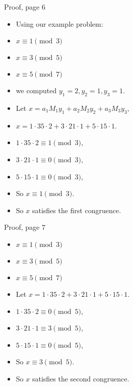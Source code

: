 \documentclass[handout]{beamer}
\begin{document}
\begin{frame}{Proof, page 6}

\begin{itemize}
  \item Using our example problem:
  \item $x \equiv 1 \pmod 3$
  \item $x \equiv 3 \pmod 5$
  \item $x \equiv 5 \pmod 7$
  \item we computed $y_1 = 2, y_2 = 1, y_3 = 1$.
  \item Let $x = a_1 M_1 y_1 + a_2 M_2 y_2 + a_3 M_3 y_3$,
  \item $x = 1 \cdot 35 \cdot 2 + 3 \cdot 21 \cdot 1 + 5 \cdot 15 \cdot 1$.
  \item $1 \cdot 35 \cdot 2 \equiv 1 \pmod 3$,
  \item $3 \cdot 21 \cdot 1 \equiv 0 \pmod 3$,
  \item $5 \cdot 15 \cdot 1 \equiv 0 \pmod 3$,
  \item So $x \equiv 1 \pmod 3$.
  \item So $x$ satisfies the first congruence.
\end{itemize}

\end{frame}

\begin{frame}{Proof, page 7}

\begin{itemize}
  \item $x \equiv 1 \pmod 3$
  \item $x \equiv 3 \pmod 5$
  \item $x \equiv 5 \pmod 7$
  \item Let $x = 1 \cdot 35 \cdot 2 + 3 \cdot 21 \cdot 1 + 5 \cdot 15 \cdot 1$.
  \item $1 \cdot 35 \cdot 2 \equiv 0 \pmod 5$,
  \item $3 \cdot 21 \cdot 1 \equiv 3 \pmod 5$,
  \item $5 \cdot 15 \cdot 1 \equiv 0 \pmod 5$,
  \item So $x \equiv 3 \pmod 5$.
  \item So $x$ satisfies the second congruence.
\end{itemize}

\end{frame}
\end{document}
